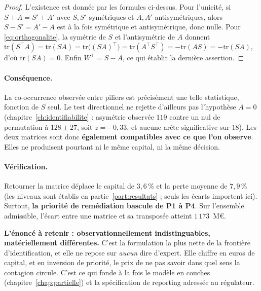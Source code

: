 \begin{proof}
L'existence est donnée par les formules ci-dessus. Pour l'unicité, si $S+A = S'+A'$ avec $S,S'$
symétriques et $A,A'$ antisymétriques, alors $S-S' = A'-A$ est à la fois symétrique et
antisymétrique, donc nulle. Pour \eqref{eq:orthogonalite}, la symétrie de $S$ et
l'antisymétrie de $A$ donnent
$\mathrm{tr}(S^{\top}A)=\mathrm{tr}(SA)=\mathrm{tr}\bigl((SA)^{\top}\bigr)
=\mathrm{tr}(A^{\top}S^{\top})=-\mathrm{tr}(AS)=-\mathrm{tr}(SA)$, d'où
$\mathrm{tr}(SA)=0$. Enfin $W^{\top}=S-A$, ce qui établit la dernière assertion.
\end{proof}

\paragraph{Conséquence.} La co-occurrence observée entre piliers est précisément une telle
statistique, fonction de $S$ seul. Le test directionnel ne rejette d'ailleurs pas l'hypothèse
$A = 0$
(chapitre~\ref{ch:identifiabilite} : asymétrie observée $119$ contre un nul de
permutation à $128 \pm 27$, soit $z = -0{,}33$, et aucune arête significative sur $18$).
Les deux matrices sont donc \textbf{également compatibles avec ce que l'on observe}. Elles
ne produisent pourtant ni le même capital, ni la même décision.

\paragraph{Vérification.} Retourner la matrice déplace le capital de $3{,}6\,\%$ et la perte
moyenne de $7{,}9\,\%$ (les niveaux sont établis en partie~\ref{part:resultats} ; seuls les
écarts importent ici). Surtout, \textbf{la priorité de remédiation bascule de P1 à P4}. Sur
l'ensemble admissible, l'écart entre une matrice et sa transposée atteint
$1\,173$~M\euro{}.

\begin{cle}
\textbf{L'énoncé à retenir : observationnellement indistinguables, matériellement
différentes.} C'est la formulation la plus nette de la frontière d'identification, et
elle ne repose sur \emph{aucun} dire d'expert. Elle chiffre en euros de capital, et en
inversion de priorité, le prix de ne pas savoir dans quel sens la contagion circule.
C'est ce qui fonde à la fois le modèle en couches (chapitre~\ref{chap:partielle}) et la
spécification de reporting adressée au régulateur.
\end{cle}

